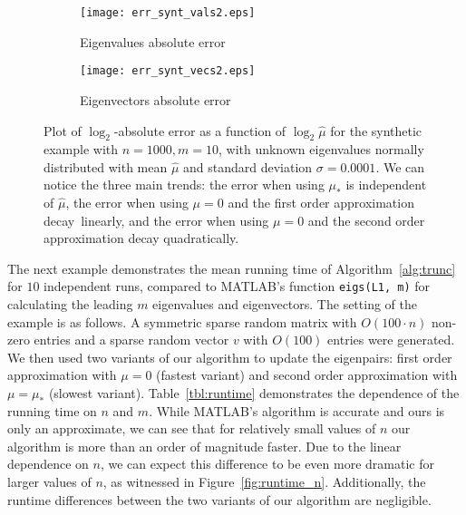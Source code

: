 \documentclass[11pt]{article}
\begin{document}
\begin{figure}
    \begin{center}
        \begin{subfigure}[b]{0.45\textwidth}
        \texttt{[image: err\_synt\_vals2.eps]}
        \caption{Eigenvalues absolute error}
    \end{subfigure} \quad
    \begin{subfigure}[b]{0.45\textwidth}
        \texttt{[image: err\_synt\_vecs2.eps]}
        \caption{Eigenvectors absolute error}
    \end{subfigure}    
        \end{center}
\caption{Plot of $\log_2$-absolute error as a function of $\log_2\hat{\mu}$ for the synthetic example with $n = 1000, m = 10$, with unknown eigenvalues normally distributed with mean $\hat{\mu}$ and standard deviation $\sigma = 0.0001$. We can notice the three main trends: the error when using $\mu_\ast$ is independent of $\hat{\mu}$, the error when using 
$\mu = 0$ and the first order approximation decay\ linearly, and the error when using $\mu = 0$ and the second order approximation decay quadratically.}
     \label{fig:sec_err_decay}
\end{figure}

The next example demonstrates the mean running time of Algorithm~\ref{alg:trunc} for $10$ independent runs, compared to MATLAB's function \texttt{eigs(L1, m)} for calculating the leading $m$ eigenvalues and eigenvectors. The setting of the example is as follows. A symmetric sparse random matrix with $O(100 \cdot n)$ non-zero entries and a  sparse random vector $v$ with $O(100)$ entries were generated. We then used two variants of our algorithm to update the eigenpairs: first order approximation with $\mu = 0$ (fastest variant) and second order approximation with $\mu = \mu_\ast$ (slowest variant). Table~\ref{tbl:runtime} demonstrates the dependence of the running time on $n$ and $m$. While MATLAB's algorithm is accurate and ours is only an approximate, we can see that for relatively small values of $n$ our algorithm is more than an order of magnitude faster. Due to the linear dependence on $n$, we can expect this difference to be even more dramatic for larger values of $n$, as witnessed in Figure~\ref{fig:runtime_n}. Additionally, the runtime differences between the two variants of our algorithm are negligible. 
\end{document}
